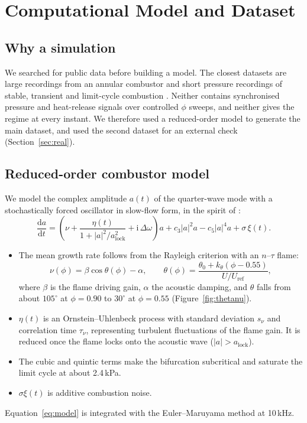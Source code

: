 \documentclass[11pt,a4paper]{article}
\begin{document}
\section{Computational Model and Dataset}\label{sec:model}

\subsection{Why a simulation}
We searched for public data before building a model. The closest datasets are large recordings from an annular combustor \cite{faurebeaulieu_data} and short pressure recordings of stable, transient and limit-cycle combustion \cite{mirjan_data}. Neither contains synchronised pressure and heat-release signals over controlled $\phi$ sweeps, and neither gives the regime at every instant. We therefore used a reduced-order model to generate the main dataset, and used the second dataset for an external check (Section~\ref{sec:real}).

\subsection{Reduced-order combustor model}
We model the complex amplitude $a(t)$ of the quarter-wave mode with a stochastically forced oscillator in slow-flow form, in the spirit of \cite{noiray2013}:
\begin{equation}
  \frac{\mathrm{d}a}{\mathrm{d}t} = \left(\nu + \frac{\eta(t)}{1+|a|^2/a_\mathrm{lock}^2} + \mathrm{i}\,\Delta\omega\right)a + c_3|a|^2a - c_5|a|^4a + \sigma\,\xi(t).
  \label{eq:model}
\end{equation}
\begin{itemize}
  \item The mean growth rate follows from the Rayleigh criterion with an $n$--$\tau$ flame:
  \begin{equation}
    \nu(\phi) = \beta\cos\theta(\phi) - \alpha,\qquad \theta(\phi) = \frac{\theta_0 + k_\theta(\phi-0.55)}{U/U_\mathrm{ref}},
    \label{eq:nu}
  \end{equation}
  where $\beta$ is the flame driving gain, $\alpha$ the acoustic damping, and $\theta$ falls from about $105^\circ$ at $\phi=0.90$ to $30^\circ$ at $\phi=0.55$ (Figure~\ref{fig:thetanu}).
  \item $\eta(t)$ is an Ornstein--Uhlenbeck process with standard deviation $s_\nu$ and correlation time $\tau_\nu$, representing turbulent fluctuations of the flame gain. It is reduced once the flame locks onto the acoustic wave ($|a|>a_\mathrm{lock}$).
  \item The cubic and quintic terms make the bifurcation subcritical and saturate the limit cycle at about 2.4\,kPa.
  \item $\sigma\xi(t)$ is additive combustion noise.
\end{itemize}
Equation~\eqref{eq:model} is integrated with the Euler--Maruyama method at 10\,kHz.
\end{document}
